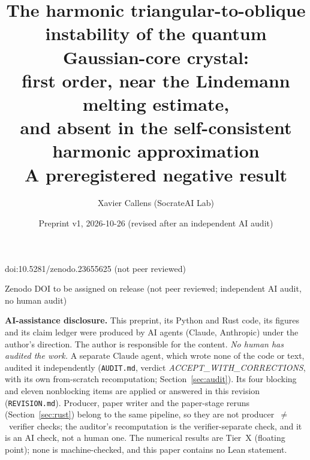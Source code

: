 \documentclass[10pt]{article}
\title{\Large\bfseries The harmonic triangular-to-oblique instability of the quantum Gaussian-core crystal:\\
first order, near the Lindemann melting estimate,\\
and absent in the self-consistent harmonic approximation\\[3pt]
\normalsize\mdseries A preregistered negative result}
\author{Xavier Callens (SocrateAI Lab)}
\date{Preprint v1, 2026-10-26 (revised after an independent AI audit)}
\begin{document}
\maketitle
\begin{center}\small doi:10.5281/zenodo.23655625 \quad (not peer reviewed)\end{center}

\begin{center}\small Zenodo DOI to be assigned on release \quad (not peer reviewed; independent AI audit, no human audit)\end{center}

\noindent\textbf{AI-assistance disclosure.} This preprint, its Python and Rust code, its figures and its claim ledger were produced by AI agents
(Claude, Anthropic) under the author's direction. The author is responsible for the content. \emph{No human has audited the work.} A separate Claude agent, which wrote none of the code or text, audited it independently
(\texttt{AUDIT.md}, verdict \emph{ACCEPT\_WITH\_CORRECTIONS}, with its own from-scratch recomputation; Section~\ref{sec:audit}). Its four blocking and eleven nonblocking items are applied or answered in this revision (\texttt{REVISION.md}).
Producer, paper writer and the paper-stage reruns (Section~\ref{sec:rust}) belong to the same pipeline, so they are not producer~$\neq$~verifier checks; the auditor's recomputation is the verifier-separate check, and it is an AI check, not a human one. The numerical
results are Tier~X (floating point); none is machine-checked, and this paper contains no Lean statement.
\end{document}
